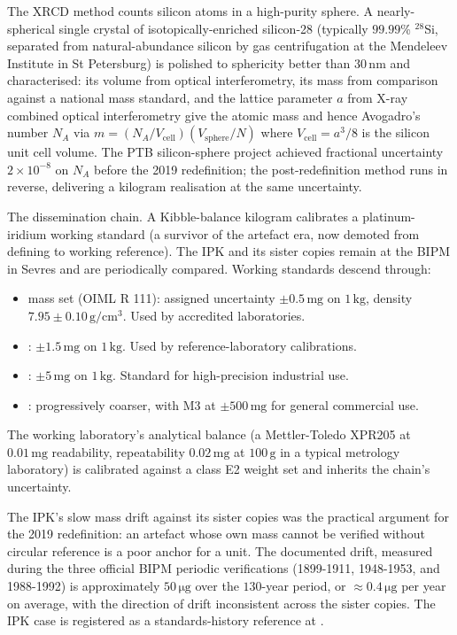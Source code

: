 The XRCD method counts silicon atoms in a high-purity sphere. A
nearly-spherical single crystal of isotopically-enriched
silicon-28 (typically $99.99$\% $^{28}$Si, separated from
natural-abundance silicon by gas centrifugation at the Mendeleev
Institute in St Petersburg) is polished to sphericity better than
$30\,\si{\nano\meter}$ and characterised: its volume from optical
interferometry, its mass from comparison against a national mass
standard, and the lattice parameter $a$ from X-ray combined
optical interferometry give the atomic mass and hence Avogadro's
number $N_{A}$ via $m = (N_{A}/V_{\text{cell}})(V_{\text{sphere}}/
N)$ where $V_{\text{cell}} = a^{3}/8$ is the silicon unit cell
volume. The PTB silicon-sphere project achieved fractional
uncertainty $2 \times 10^{-8}$ on $N_{A}$ before the 2019
redefinition; the post-redefinition method runs in reverse,
delivering a kilogram realisation at the same uncertainty.

The dissemination chain. A Kibble-balance kilogram calibrates a
platinum-iridium working standard (a survivor of the artefact
era, now demoted from defining to working reference). The IPK and
its sister copies remain at the BIPM in Sevres and are
periodically compared. Working standards descend through:
\begin{itemize}[leftmargin=*]
  \item {} mass set (OIML R 111): assigned
    uncertainty $\pm 0.5\,\si{\milli\gram}$ on $1\,\si{\kilo\gram}$,
    density $7.95 \pm 0.10\,\si{\gram\per\centi\meter\cubed}$.
    Used by accredited laboratories.
  \item {}: $\pm 1.5\,\si{\milli\gram}$ on
    $1\,\si{\kilo\gram}$. Used by reference-laboratory calibrations.
  \item {}: $\pm 5\,\si{\milli\gram}$ on
    $1\,\si{\kilo\gram}$. Standard for high-precision industrial use.
  \item {}: progressively coarser, with
    M3 at $\pm 500\,\si{\milli\gram}$ for general commercial use.
\end{itemize}
The working laboratory's analytical balance (a Mettler-Toledo
XPR205 at $0.01\,\si{\milli\gram}$ readability, repeatability
$0.02\,\si{\milli\gram}$ at $100\,\si{\gram}$ in a typical
metrology laboratory) is calibrated against a class E2 weight set
and inherits the chain's uncertainty.

The IPK's slow mass drift against its sister copies was the
practical argument for the 2019 redefinition: an artefact whose
own mass cannot be verified without circular reference is a poor
anchor for a unit. The documented drift, measured during the
three official BIPM periodic verifications (1899-1911, 1948-1953,
and 1988-1992) is approximately $50\,\si{\micro\gram}$ over the
$130$-year period, or $\approx 0.4\,\si{\micro\gram}$ per year on
average, with the direction of drift inconsistent across the
sister copies. The IPK case is registered as a standards-history
reference at
.

